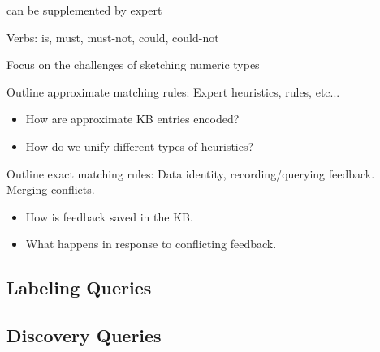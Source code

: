  can be supplemented by expert 


Verbs: is, must, must-not, could, could-not


Focus on the challenges of sketching numeric types

Outline approximate matching rules: Expert heuristics, rules, etc...
\begin{itemize}
  \item How are approximate KB entries encoded?
  \item How do we unify different types of heuristics?
\end{itemize}



Outline exact matching rules: Data identity, recording/querying feedback.  Merging conflicts.

\begin{itemize}
  \item How is feedback saved in the KB.
  \item What happens in response to conflicting feedback.  
\end{itemize}



\subsection{Labeling Queries}

\subsection{Discovery Queries}
